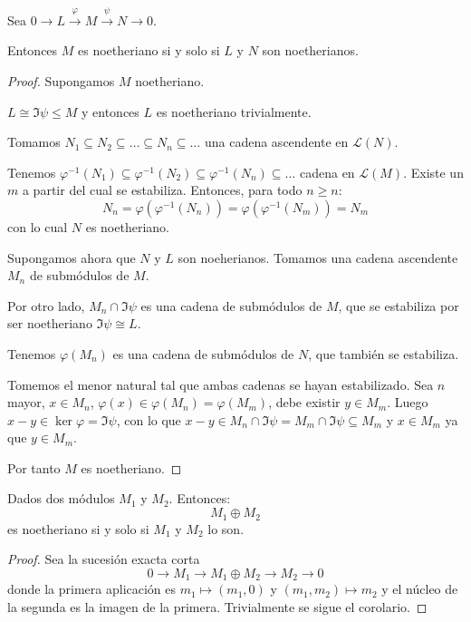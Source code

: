 \begin{prop}
  Sea \(0\longrightarrow L\overset{\varphi}{\longrightarrow}
  M\overset{\psi}{\longrightarrow} N
  \longrightarrow 0\).

  Entonces \(M\) es noetheriano si y solo si \(L\) y \(N\) son
  noetherianos.
\end{prop}

\begin{proof}
  Supongamos \(M\) noetheriano.

  \(L\cong \Im\psi\le M\) y entonces \(L\) es noetheriano trivialmente.

  Tomamos \(N_1\subseteq N_2\subseteq\ldots\subseteq N_n\subseteq\ldots\)
  una cadena ascendente en \(\mathcal{L}(N)\).

  Tenemos \(\varphi^{-1}(N_1)\subseteq \varphi^{-1}(N_2)
  \subseteq \varphi^{-1}(N_n)\subseteq\ldots\)
  cadena en \(\mathcal{L}(M)\). Existe un \(m\) a partir del cual
  se estabiliza. Entonces, para todo \(n\ge n\):
  \[
    N_n=\varphi(\varphi^{-1}(N_n))=\varphi(\varphi^{-1}(N_m))=N_m
  \]
  con lo cual \(N\) es noetheriano.


  Supongamos ahora que \(N\) y \(L\) son noeherianos.
  Tomamos una cadena ascendente \(M_n\) de submódulos de \(M\).

  Por otro lado, \(M_n\cap\Im\psi\) es una cadena de submódulos de
  \(M\), que se estabiliza por ser noetheriano \(\Im\psi\cong L\).

  Tenemos \(\varphi(M_n)\) es una cadena de submódulos de \(N\),
  que también se estabiliza.

  Tomemos el menor natural tal que ambas cadenas se hayan estabilizado.
  Sea \(n\) mayor, \(x\in M_n\), \(\varphi(x)\in\varphi(M_n)
  =\varphi(M_m)\), debe existir \(y\in M_m\). Luego \(x-y\in\ker\varphi
  =\Im\psi\), con lo que \(x-y\in M_n\cap\Im\psi=M_m\cap\Im\psi\subseteq M_m\)
  y \(x\in M_m\) ya que \(y\in M_m\).

  Por tanto \(M\) es noetheriano.
\end{proof}

\begin{cor}
  Dados dos módulos \(M_1\) y \(M_2\).
  Entonces:
  \[
    M_1\oplus M_2
  \]
  es noetheriano si y solo si \(M_1\) y \(M_2\) lo son.
\end{cor}

\begin{proof}
  Sea la sucesión exacta corta
  \[
    0\longrightarrow M_1\longrightarrow M_1\oplus M_2\longrightarrow M_2
    \longrightarrow 0
  \]
  donde la primera aplicación es \(m_1\mapsto(m_1,0)\)
  y \((m_1,m_2)\mapsto m_2\) y el núcleo de la segunda es la imagen de
  la primera. Trivialmente se sigue el corolario.
\end{proof}

